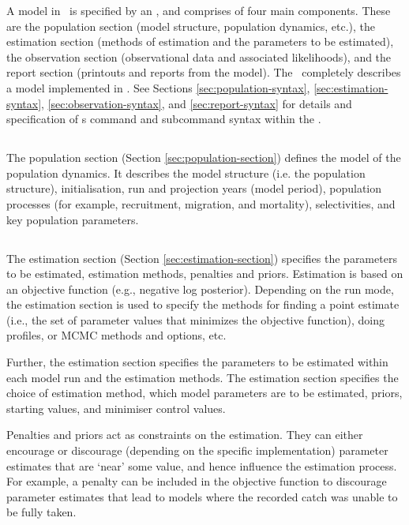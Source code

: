 A model in \CNAME\ is specified by an \config, and comprises of four main components. These are the population section (model structure, population dynamics, etc.), the estimation section (methods of estimation and the parameters to be estimated), the observation section (observational data and associated likelihoods), and the report section (printouts and reports from the model). The \config\  completely describes a model implemented in \CNAME. See Sections \ref{sec:population-syntax}, \ref{sec:estimation-syntax}, \ref{sec:observation-syntax}, and \ref{sec:report-syntax} for details and specification of \CNAME s command and subcommand syntax within the \config. 

\subsection{}
The population section (Section \ref{sec:population-section}) defines the model of the population dynamics. It describes the model structure (i.e. the population structure), initialisation, run and projection years (model period), population processes (for example, recruitment, migration, and mortality), selectivities, and key population parameters.

\subsection{}
The estimation section (Section \ref{sec:estimation-section}) specifies the parameters to be estimated, estimation methods, penalties and priors. Estimation is based on an objective function (e.g., negative log posterior). Depending on the run mode, the estimation section is used to specify the methods for finding a point estimate (i.e., the set of parameter values that minimizes the objective function), doing profiles, or MCMC methods and options, etc.

Further, the estimation section specifies the parameters to be estimated within each model run and the estimation methods. The estimation section specifies the choice of estimation method, which model parameters are to be estimated, priors, starting values, and minimiser control values.

Penalties and priors act as constraints on the estimation. They can either encourage or discourage (depending on the specific implementation) parameter estimates that are `near' some value, and hence influence the estimation process. For example, a penalty can be included in the objective function to discourage parameter estimates that lead to models where the recorded catch was unable to be fully taken.

